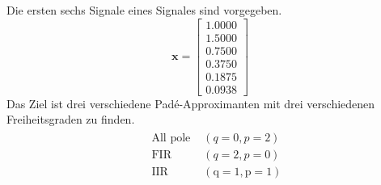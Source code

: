 \begin{beispiel}

Die ersten sechs Signale eines Signales sind vorgegeben.
\begin{equation*}
\bm x=\left[
\begin{array}{l}
1.0000\\
1.5000\\
0.7500\\
0.3750\\
0.1875 \\
0.0938
\end{array}\right]
\end{equation*}
Das Ziel ist drei verschiedene Padé-Approximanten mit drei verschiedenen Freiheitsgraden zu finden.
\begin{equation*}\begin{aligned}
&\begin{array}{ll}
\text { All pole } & (q=0, p=2) \\
\text { FIR } & (q=2, p=0)\\
\text { IIR } &(\mathrm{q}=1, \mathrm{p}=1)
\end{array}\\
\end{aligned}\end{equation*}


\end{beispiel}
